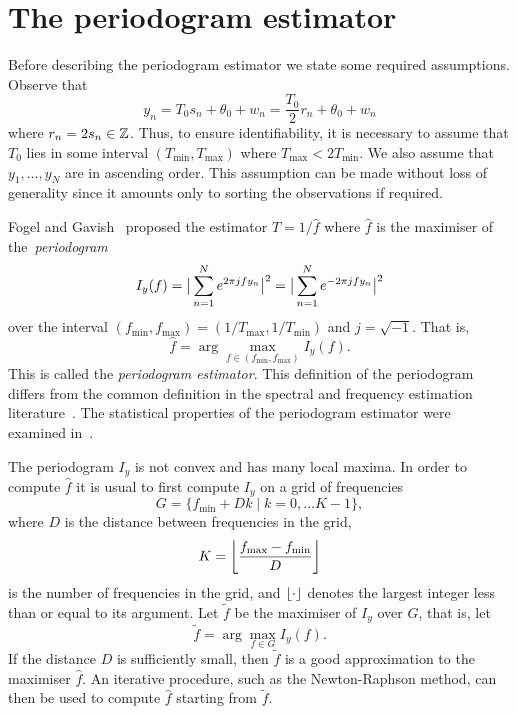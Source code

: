 \documentclass[10pt,twocolumn,twoside]{IEEEtran}
\begin{document}
\section{The periodogram estimator}\label{sec:peri-estim}

Before describing the periodogram estimator we state some required assumptions.  Observe that
\[
y_n = T_0 s_n + \theta_0 + w_n = \frac{T_0}{2} r_n + \theta_0 + w_n
\]
where $r_n = 2s_n \in {\mathbb Z}$.  Thus, to ensure identifiability, it is necessary to assume that $T_0$ lies in some interval $(T_{\text{min}}, T_{\text{max}})$ where $T_{\text{max}} < 2T_{\text{min}}$.  We also assume that $y_1,\dots,y_N$ are in ascending order.  This assumption can be made without loss of generality since it amounts only to sorting the observations if required.


Fogel and Gavish~\cite{Fogel1988,Fogel1989_bit_synch_zero_crossings} proposed the estimator $\hat{T} = 1/\hat{f}$ where $\hat{f}$ is the maximiser of the~\emph{periodogram}
\[
I_y(f) = \big\vert  \sum_{n=1}^N e^{ 2\pi j f y_n}  \big\vert^2 = \big\vert  \sum_{n=1}^N e^{ -2\pi j f y_n}  \big\vert^2 
\]
over the interval $(f_{\text{min}}, f_{\text{max}}) = (1/T_{\text{max}}, 1/T_{\text{min}})$ and $j = \sqrt{-1}$.  That is,
\[
\hat{f} = \arg\max_{f \in (f_{\text{min}}, f_{\text{max}})} I_y(f).
\] 
This is called the \emph{periodogram estimator}.  This definition of the periodogram differs from the common definition in the spectral and frequency estimation literature~\cite{Hannan_time_series_1967,Quinn2001}.  The statistical properties of the periodogram estimator were examined in~\cite{Quinn20013asilomar_period_est}.

The periodogram $I_y$ is not convex and has many local maxima.  In order to compute $\hat{f}$ it is usual to first compute $I_y$ on a grid of frequencies
\[
G = \{ f_{\text{min}} + Dk \mid k = 0, \dots K-1 \},
\]
where $D$ is the distance between frequencies in the grid, 
\[
K =  {\left\lfloor \frac{f_{\text{max}} - f_{\text{min}}}{D} \right\rfloor}
\]
is the number of frequencies in the grid, and ${\left\lfloor \cdot \right\rfloor}$ denotes the largest integer less than or equal to its argument.  
Let $\widetilde{f}$ be the maximiser of $I_y$ over $G$, that is, let
\[
\widetilde{f} = \arg\max_{f \in G} I_y(f).
\]
If the distance $D$ is sufficiently small, then $\widetilde{f}$ is a good approximation to the maximiser $\hat{f}$.  An iterative procedure, such as the Newton-Raphson method, %
can then be used to compute $\hat{f}$ starting from $\widetilde{f}$.
\end{document}
